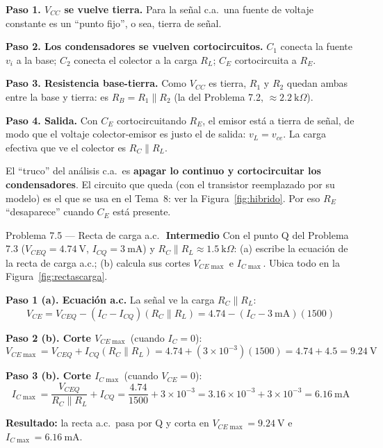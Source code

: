\documentclass[11pt,a4paper]{article}
\newcommand{\intermedio}{\textcolor{naranjaVivo}{\faIcon{circle}\,\textbf{Intermedio}}}
\begin{document}
\begin{solucionBox}
\textbf{Paso 1. $V_{CC}$ se vuelve tierra.} Para la señal c.a.\ una fuente de voltaje constante es un ``punto fijo'', o sea, tierra de señal.

\textbf{Paso 2. Los condensadores se vuelven cortocircuitos.} $C_1$ conecta la fuente $v_i$ a la base; $C_2$ conecta el colector a la carga $R_L$; $C_E$ cortocircuita a $R_E$.

\textbf{Paso 3. Resistencia base-tierra.} Como $V_{CC}$ es tierra, $R_1$ y $R_2$ quedan ambas entre la base y tierra: es $R_B=R_1\parallel R_2$ (la del Problema 7.2, $\approx 2.2\ \text{k}\Omega$).

\textbf{Paso 4. Salida.} Con $C_E$ cortocircuitando $R_E$, el emisor está a tierra de señal, de modo que el voltaje colector-emisor es justo el de salida: $v_L=v_{ce}$. La carga efectiva que ve el colector es $R_C\parallel R_L$.
\end{solucionBox}

\begin{porqueBox}
El ``truco'' del análisis c.a.\ es \textbf{apagar lo continuo y cortocircuitar los condensadores}. El circuito que queda (con el transistor reemplazado por su modelo) es el que se usa en el Tema~8: ver la Figura~\ref{fig:hibrido}. Por eso $R_E$ ``desaparece'' cuando $C_E$ está presente.
\end{porqueBox}

\begin{problemaBox}{Problema 7.5 --- Recta de carga a.c.\ \quad \intermedio}
Con el punto Q del Problema 7.3 ($V_{CEQ}=4.74\ \text{V}$, $I_{CQ}=3\ \text{mA}$) y $R_C\parallel R_L\approx1.5\ \text{k}\Omega$: (a) escribe la ecuación de la recta de carga a.c.; (b) calcula sus cortes $V_{CE\max}$ e $I_{C\max}$. Ubica todo en la Figura~\ref{fig:rectascarga}.
\end{problemaBox}

\begin{solucionBox}
\textbf{Paso 1 (a). Ecuación a.c.} La señal ve la carga $R_C\parallel R_L$:
\[
V_{CE}=V_{CEQ}-(I_C-I_{CQ})(R_C\parallel R_L)=4.74-(I_C-3\ \text{mA})(1500)
\]

\textbf{Paso 2 (b). Corte $V_{CE\max}$} (cuando $I_C=0$):
\[
V_{CE\max}=V_{CEQ}+I_{CQ}(R_C\parallel R_L)=4.74+(3\times10^{-3})(1500)=4.74+4.5=9.24\ \text{V}
\]

\textbf{Paso 3 (b). Corte $I_{C\max}$} (cuando $V_{CE}=0$):
\[
I_{C\max}=\frac{V_{CEQ}}{R_C\parallel R_L}+I_{CQ}=\frac{4.74}{1500}+3\times10^{-3}=3.16\times10^{-3}+3\times10^{-3}=6.16\ \text{mA}
\]

\textbf{Resultado:} la recta a.c.\ pasa por Q y corta en $V_{CE\max}=9.24\ \text{V}$ e $I_{C\max}=6.16\ \text{mA}$.
\end{solucionBox}
\end{document}
